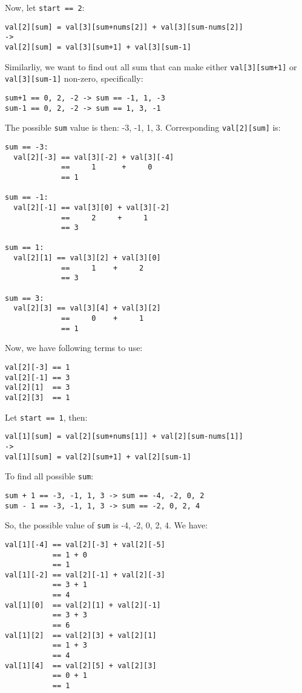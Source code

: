 \documentclass[11pt]{article}
\begin{document}
Now, let \texttt{start == 2}:
\begin{Verbatim}[frame=single]
val[2][sum] = val[3][sum+nums[2]] + val[3][sum-nums[2]]
->
val[2][sum] = val[3][sum+1] + val[3][sum-1]
\end{Verbatim}
Similarliy, we want to find out all sum that can make either \texttt{val[3][sum+1]} or \texttt{val[3][sum-1]} non-zero, specifically:
\begin{Verbatim}[frame=single]
sum+1 == 0, 2, -2 -> sum == -1, 1, -3
sum-1 == 0, 2, -2 -> sum == 1, 3, -1
\end{Verbatim}
The possible \texttt{sum} value is then: -3, -1, 1, 3. Corresponding \texttt{val[2][sum]} is:
\begin{Verbatim}[frame=single]
sum == -3:
  val[2][-3] == val[3][-2] + val[3][-4]
             ==     1      +     0
             == 1

sum == -1:
  val[2][-1] == val[3][0] + val[3][-2]
             ==     2     +     1
             == 3

sum == 1:
  val[2][1] == val[3][2] + val[3][0]
             ==     1    +     2
             == 3

sum == 3:
  val[2][3] == val[3][4] + val[3][2]
             ==     0    +     1
             == 1             
\end{Verbatim}
Now, we have following terms to use:
\begin{Verbatim}[frame=single]
val[2][-3] == 1
val[2][-1] == 3
val[2][1]  == 3
val[2][3]  == 1
\end{Verbatim}
Let \texttt{start == 1}, then:
\begin{Verbatim}[frame=single]
val[1][sum] = val[2][sum+nums[1]] + val[2][sum-nums[1]]
->
val[1][sum] = val[2][sum+1] + val[2][sum-1]
\end{Verbatim}
To find all possible \texttt{sum}:
\begin{Verbatim}[frame=single]
sum + 1 == -3, -1, 1, 3 -> sum == -4, -2, 0, 2
sum - 1 == -3, -1, 1, 3 -> sum == -2, 0, 2, 4
\end{Verbatim}
So, the possible value of \texttt{sum} is -4, -2, 0, 2, 4. We have:
\begin{Verbatim}[frame=single]
val[1][-4] == val[2][-3] + val[2][-5]
           == 1 + 0
           == 1
val[1][-2] == val[2][-1] + val[2][-3]
           == 3 + 1
           == 4
val[1][0]  == val[2][1] + val[2][-1]
           == 3 + 3
           == 6
val[1][2]  == val[2][3] + val[2][1]
           == 1 + 3
           == 4
val[1][4]  == val[2][5] + val[2][3]
           == 0 + 1
           == 1           
\end{Verbatim}
\end{document}
